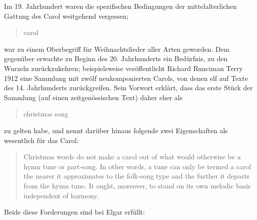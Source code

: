 \documentclass[a4paper,11pt,open=any]{scrbook}
\newcommand{\engquote}[1]{\foreignblockquote{english}{#1}}
\begin{document}
Im 19. Jahrhundert waren die spezifischen Bedingungen der mittelalterlichen
Gattung des Carol weitgehend vergessen; \engquote{carol} war zu einem
Oberbegriff für Weihnachtslieder aller Arten geworden.  Dem gegenüber erwachte
zu Beginn des 20. Jahrhunderts ein Bedürfnis, zu den Wurzeln zurückzukehren;
beispielsweise veröffentlicht Richard Runciman Terry 1912 eine Sammlung mit
zwölf neukomponierten Carols, von denen elf auf Texte des 14. Jahrhunderts
zurückgreifen.  Sein Vorwort erklärt, dass das erste Stück der Sammlung (auf
einen zeitgenössischen Text) daher eher als \engquote{christmas song} zu
gelten habe, und nennt darüber hinaus folgende zwei Eigenschaften als
wesentlich für das Carol:

\engquote{Christmas words do not make a carol out of what would otherwise
be a hymn tune or part-song.  In other words, a tune can only be termed a
carol the nearer it approximates to the folk-song type and the further it
departs from the hymn tune.  It ought, moreover, to stand on its own melodic
basis independent of harmony.\cite[preface.]{terry}}

\noindent Beide diese Forderungen sind bei Elgar erfüllt:
\end{document}
